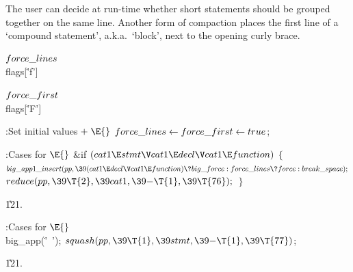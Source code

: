 The user can decide at run-time whether short statements should be
grouped together on the same line. Another form of compaction places
the first line of a `compound statement', a.k.a.\ `block', next to
the opening curly brace.

\Y\B\4\D$\\{force\_lines}$ \5
\\{flags}[\.{'f'}]\par
\B\4\D$\\{force\_first}$ \5
\\{flags}[\.{'F'}]\par
\Y\B\4:Set initial values\X${}\mathrel+\E{}$\6
$\\{force\_lines}\leftarrow\\{force\_first}\leftarrow\\{true}{}$;\par
\fi

\B{}:Cases for \X${}\E{}$\6
\&{if} ${}(\\{cat1}\E\\{stmt}\V\\{cat1}\E\\{decl}\V\\{cat1}\E\\{function}){}$\5
${}\{{}$\1\6
${}\\{big\_app1\_insert}(\\{pp},\39(\\{cat1}\E\\{decl}\V\\{cat1}\E\\{function})%
\?\\{big\_force}:\\{force\_lines}\?\\{force}:\\{break\_space});{}$\6
${}\\{reduce}(\\{pp},\39\T{2},\39\\{cat1},\39{-}\T{1},\39\T{76});{}$\6
\4${}\}{}$\2\par
\U121.\fi

\B{}:Cases for \X${}\E{}$\6
\\{big\_app}(\.{'\ '});\6
${}\\{squash}(\\{pp},\39\T{1},\39\\{stmt},\39{-}\T{1},\39\T{77}){}$;\par
\U121.\fi

